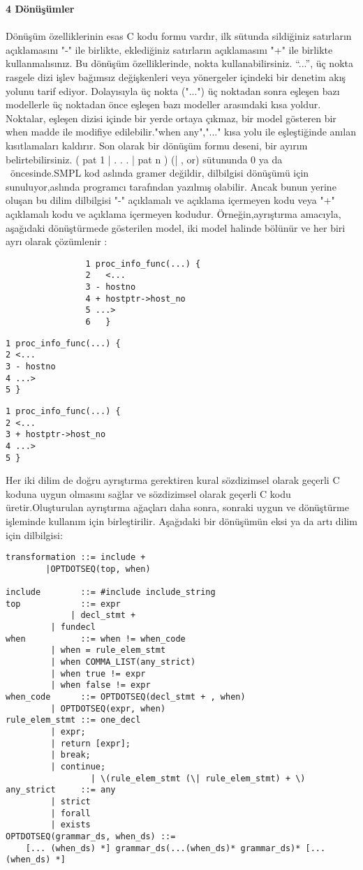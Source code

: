 \documentclass[22pt]{article}
\begin{document}
\textbf{4 Dönüşümler}\\
\\
Dönüşüm özelliklerinin esas C kodu formu vardır, ilk sütunda sildiğiniz satırların açıklamasını "-" ile birlikte, eklediğiniz satırların açıklamasını "+" ile birlikte kullanmalısınız. Bu dönüşüm özelliklerinde, nokta  kullanabilirsiniz. “...”, üç nokta  rasgele dizi işlev bağımsız değişkenleri veya yönergeler içindeki bir denetim akış yolunu tarif ediyor. Dolayısıyla üç nokta ("...") üç noktadan sonra eşleşen bazı modellerle üç noktadan önce eşleşen bazı modeller arasındaki kısa yoldur. Noktalar, eşleşen dizisi içinde bir yerde ortaya çıkmaz, bir model gösteren bir when madde ile modifiye edilebilir."when any","..." kısa yolu ile eşleştiğinde anılan kısıtlamaları kaldırır. Son olarak bir dönüşüm formu deseni, bir ayırım belirtebilirsiniz. ( pat 1 | . . . | pat n ) (| , or) sütununda 0 ya da \ öncesinde.SMPL kod aslında gramer değildir, dilbilgisi dönüşümü için sunuluyor,aslında programcı tarafından yazılmış olabilir. Ancak bunun yerine oluşan bu dilim dilbilgisi "-" açıklamalı ve açıklama içermeyen kodu veya "+" açıklamalı kodu ve açıklama içermeyen kodudur. Örneğin,ayrıştırma amacıyla, aşağıdaki dönüştürmede gösterilen model, iki model halinde bölünür ve her biri ayrı olarak çözümlenir :
\begin{lstlisting}
				1 proc_info_func(...) {
				2	<...
				3 - hostno
				4 + hostptr->host_no
				5 ...>
				6	}
\end{lstlisting}
\begin{multicols}{2}
\begin{lstlisting}
1 proc_info_func(...) {
2 <...                  
3 - hostno              
4 ...>                  
5 } 
\end{lstlisting}
\columnbreak
\begin{lstlisting}
1 proc_info_func(...) {
2 <...
3 + hostptr->host_no
4 ...>
5 }
\end{lstlisting}
\end{multicols}
Her iki dilim de doğru ayrıştırma gerektiren kural sözdizimsel olarak geçerli C koduna uygun olmasını sağlar ve sözdizimsel olarak geçerli C kodu üretir.Oluşturulan ayrıştırma ağaçları daha sonra, sonraki uygun ve dönüştürme işleminde kullanım için birleştirilir. Aşağıdaki  bir dönüşümün eksi ya da artı dilim için dilbilgisi:
\begin{lstlisting}
transformation ::= include +
		|OPTDOTSEQ(top, when)

include        ::= #include include_string
top            ::= expr
	         | decl_stmt +
		 | fundecl
when 	       ::= when != when_code
		 | when = rule_elem_stmt
		 | when COMMA_LIST(any_strict)
		 | when true != expr
		 | when false != expr
when_code      ::= OPTDOTSEQ(decl_stmt + , when)
		 | OPTDOTSEQ(expr, when)
rule_elem_stmt ::= one_decl
		 | expr;
		 | return [expr];
		 | break;
		 | continue;
                 | \(rule_elem_stmt (\| rule_elem_stmt) + \)
any_strict     ::= any
		 | strict
		 | forall
		 | exists
OPTDOTSEQ(grammar_ds, when_ds) ::=
	[... (when_ds) *] grammar_ds(...(when_ds)* grammar_ds)* [...(when_ds) *]
\end{lstlisting}
\end{document}
